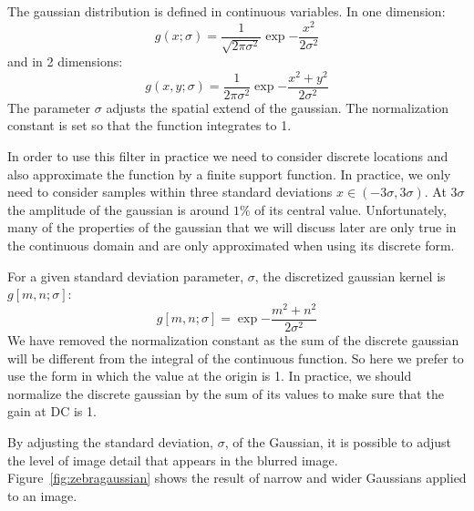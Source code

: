 The gaussian distribution is defined in continuous variables. In one dimension:
\begin{equation}
g(x; \sigma) = \frac{1}{\sqrt{2 \pi \sigma^2}} \exp{-\frac{x^2}{2 \sigma^2}}
\label{eq:gauss1dcont}
\end{equation}
and in 2 dimensions:
\begin{equation}
g(x,y; \sigma) = \frac{1}{2 \pi \sigma^2} \exp{-\frac{x^2 +
   y^2}{2 \sigma^2}}
\label{eq:gauss2dcont}
\end{equation}
The parameter $\sigma$ adjusts the spatial extend of the gaussian. The normalization constant is set so that the function integrates to 1.

In order to use this filter in practice we need to consider discrete locations and also approximate the function by a finite support function. In practice, we only need to consider samples within three standard deviations $x \in (-3\sigma, 3\sigma)$. At $3\sigma$ the amplitude of the gaussian is around $1\%$ of its central value. Unfortunately, many of the properties of the gaussian that we will discuss later are only true in the continuous domain and are only approximated when using its discrete form. 

For a given standard deviation parameter, $\sigma$, the discretized gaussian kernel is $g \left[m, n; \sigma \right]$:
\begin{equation}
g \left[ m,n; \sigma \right] = \exp{-\frac{m^2 +
   n^2}{2 \sigma^2}}
\label{eq:gauss2d}
\end{equation}
We have removed the normalization constant as the sum of the discrete gaussian will be different from the integral of the continuous function. So here we prefer to use the form in which the value at the origin is 1. In practice, we should normalize the discrete gaussian by the sum of its values to make sure that the gain at DC is 1. 

By adjusting the standard deviation, $\sigma$, of the Gaussian, it is possible to adjust the level of image detail
that appears in the blurred image. Figure~\ref{fig:zebragaussian} shows the result of narrow and wider Gaussians applied to an image. 
 

